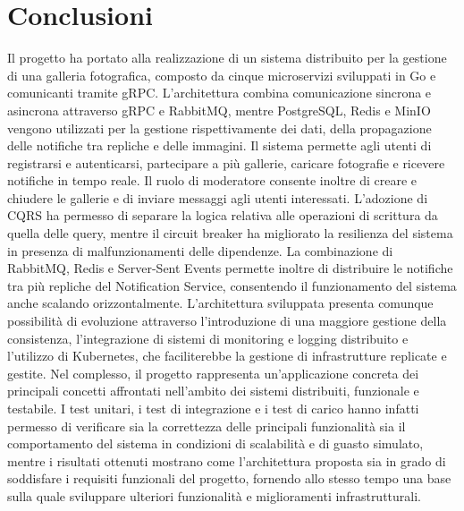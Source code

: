 \documentclass[conference]{IEEEtran}
\begin{document}
\section{Conclusioni}
Il progetto ha portato alla realizzazione di un sistema distribuito per la gestione di una galleria fotografica, composto da cinque microservizi sviluppati in Go e comunicanti tramite gRPC. L'architettura combina comunicazione sincrona e asincrona attraverso gRPC e RabbitMQ, mentre PostgreSQL, Redis e MinIO vengono utilizzati per la gestione rispettivamente dei dati, della propagazione delle notifiche tra repliche e delle immagini. Il sistema permette agli utenti di registrarsi e autenticarsi, partecipare a più gallerie, caricare fotografie e ricevere notifiche in tempo reale. Il ruolo di moderatore consente inoltre di creare e chiudere le gallerie e di inviare messaggi agli utenti interessati. L'adozione di CQRS ha permesso di separare la logica relativa alle operazioni di scrittura da quella delle query, mentre il circuit breaker ha migliorato la resilienza del sistema in presenza di malfunzionamenti delle dipendenze. La combinazione di RabbitMQ, Redis e Server-Sent Events permette inoltre di distribuire le notifiche tra più repliche del Notification Service, consentendo il funzionamento del sistema anche scalando orizzontalmente. L'architettura sviluppata presenta comunque possibilità di evoluzione attraverso l'introduzione di una maggiore gestione della consistenza, l'integrazione di sistemi di monitoring e logging distribuito e l'utilizzo di Kubernetes, che faciliterebbe la gestione di infrastrutture replicate e gestite. Nel complesso, il progetto rappresenta un'applicazione concreta dei principali concetti affrontati nell'ambito dei sistemi distribuiti, funzionale e testabile. I test unitari, i test di integrazione e i test di carico hanno infatti permesso di verificare sia la correttezza delle principali funzionalità sia il comportamento del sistema in condizioni di scalabilità e di guasto simulato, mentre i risultati ottenuti mostrano come l'architettura proposta sia in grado di soddisfare i requisiti funzionali del progetto, fornendo allo stesso tempo una base sulla quale sviluppare ulteriori funzionalità e miglioramenti infrastrutturali.
\end{document}
